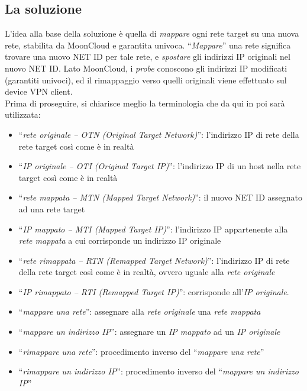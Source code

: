 \subsection{La soluzione}
L'idea alla base della soluzione è quella di \textit{mappare} ogni rete target
su una nuova rete, stabilita da MoonCloud e garantita univoca.
``\textit{Mappare}'' una rete significa trovare una nuovo NET ID per tale rete, e
\textit{spostare} gli indirizzi IP originali nel nuovo NET ID. Lato MoonCloud, i
\textit{probe} conoscono gli indirizzi IP modificati (garantiti univoci), ed il rimappaggio
verso quelli originali viene effettuato sul device VPN client.\\
Prima di proseguire, si chiarisce meglio la terminologia che da qui in poi sarà utilizzata:
\begin{itemize}
	\item ``\textit{rete originale -- OTN (Original Target Network)}'': l'indirizzo IP di rete della rete target così come
	      è in realtà
	\item ``\textit{IP originale -- OTI (Original Target IP)}'': l'indirizzo IP di un
	      host nella rete target così
	      come è in realtà
	\item ``\textit{rete mappata -- MTN (Mapped Target Network)}'': il nuovo NET ID
	      assegnato ad una rete target
	\item ``\textit{IP mappato -- MTI (Mapped Target IP)}'': l'indirizzo IP appartenente alla \textit{rete
		mappata} a cui corrisponde un indirizzo IP originale
		\item ``\textit{rete rimappata -- RTN (Remapped Target Network)}'':  l'indirizzo
		      IP di rete della rete target così
		      come è in realtà, ovvero uguale alla \textit{rete originale}
		\item ``\textit{IP rimappato -- RTI (Remapped Target IP)}'': corrisponde all'\textit{IP originale}.
		\item ``\textit{mappare una rete}'': assegnare alla \textit{rete originale} una
		      \textit{rete mappata}
		\item ``\textit{mappare un indirizzo IP}'': assegnare un \textit{IP mappato}
		      ad un \textit{IP originale}
		\item ``\textit{rimappare una rete}'': procedimento inverso del
		      ``\textit{mappare una rete}''
		\item ``\textit{rimappare un indirizzo IP}'': procedimento inverso del
		      ``\textit{mappare un indirizzo IP}''
	\end{itemize}
